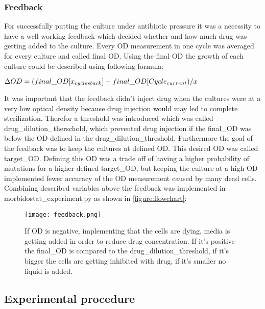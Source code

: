 \subsubsection{Feedback} 
For successfully putting the culture under antibiotic pressure it was a necessity to have a well working feedback which decided whether and how much drug was getting added to the culture. 
Every OD measurement in one cycle was averaged for every culture and called final OD. Using the final OD the growth of each culture could be described using following formula:
\begin{center}
	$\Delta OD = (final\_OD[x_{cycles \space back}] - final\_OD[Cycle_{current})/x$
\end{center}
It was important that the feedback didn't inject drug when the cultures were at a very low optical density because drug injection would may led to complete sterilization. Therefor a threshold was introduced which was called drug\_dilution\_therschold, which prevented drug injection if the final\_OD was below the OD defined in the drug\_dilution\_threshold.
Furthermore the goal of the feedback was to keep the cultures at defined OD. This desired OD was called target\_OD. Defining this OD was a trade off of having a higher probability of mutations for a higher defined target\_OD, but keeping the culture at a high OD implemented fewer accuracy of the OD measurement caused by many dead cells.  
Combining described variables above the feedback was implemented in morbidostat\_experiment.py as shown in \ref{figure:flowchart}:
\begin{figure}
	\texttt{[image: feedback.png]}
	\caption{If \textDelta OD is negative, implementing that the cells are dying, media is getting added in order to reduce drug concentration. If it's positive the final\_OD is compared to the drug\_dilution\_threshold, if it's bigger the cells are getting inhibited with drug, if it's smaller no liquid is added.}
	\label{figure:feedback}
\end{figure}

\subsection{Experimental procedure}
